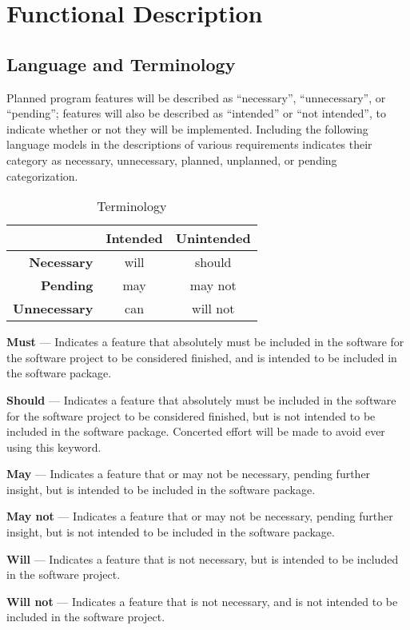 \documentclass[12pt]{article}
\begin{document}
\section{Functional Description}
\subsection{Language and Terminology}
Planned program features will be described as ``necessary'', ``unnecessary'',
or ``pending''; features will also be described as ``intended'' or ``not
intended'', to indicate whether or not they will be implemented.
Including the following language models in the descriptions of various
requirements indicates their category as necessary, unnecessary, planned,
unplanned, or pending categorization.

\begin{table}[!h]
\centering
\begin{tabular}{|r||c|c|}
\hline 
& \textbf{Intended} & \textbf{Unintended} \\ 
\hline 
\textbf{Necessary} & will & should \\ 
\hline 
\textbf{Pending} & may & may not \\ 
\hline 
\textbf{Unnecessary} & can & will not \\ 
\hline 
\end{tabular}
\caption{Terminology}
\end{table}

\textbf{Must} --- Indicates a feature that absolutely must be included in the
software for the software project to be considered finished, and is intended
to be included in the software package.
	
\textbf{Should} --- Indicates a feature that absolutely must be included in the
software for the software project to be considered finished, but is not
intended to be included in the software package.  Concerted effort will be made
to avoid ever using this keyword.
	
\textbf{May} --- Indicates a feature that or may not be necessary, pending
further insight, but is intended to be included in the software package.
	
\textbf{May not} --- Indicates a feature that or may not be necessary, pending
further insight, but is not intended to be included in the software package.
	
\textbf{Will} --- Indicates a feature that is not necessary, but is intended
to be included in the software project.
	
\textbf{Will not} --- Indicates a feature that is not necessary, and is not
intended to be included in the software project.
\end{document}
